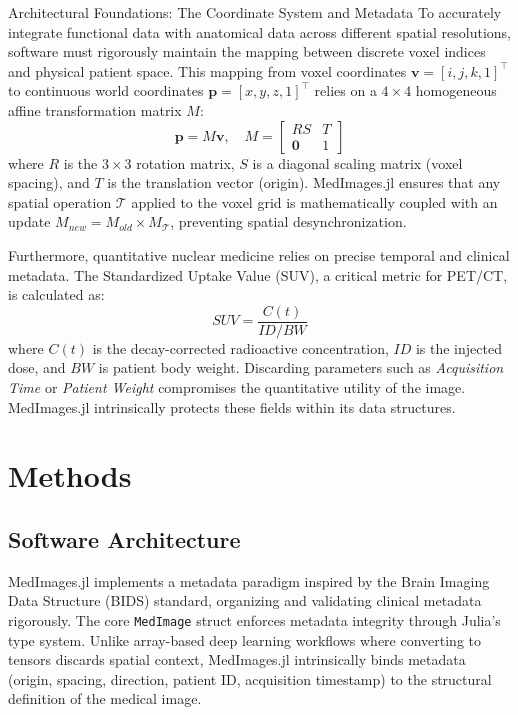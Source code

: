 \documentclass[10pt,letterpaper]{article}
\begin{document}
Architectural Foundations: The Coordinate System and Metadata
To accurately integrate functional data with anatomical data across different spatial resolutions, software must rigorously maintain the mapping between discrete voxel indices and physical patient space. This mapping from voxel coordinates $\mathbf{v} = [i, j, k, 1]^\top$ to continuous world coordinates $\mathbf{p} = [x, y, z, 1]^\top$ relies on a $4 \times 4$ homogeneous affine transformation matrix $M$:
\begin{equation}
\mathbf{p} = M \mathbf{v}, \quad M = 
\begin{bmatrix} 
R S & T \\
\mathbf{0} & 1
\end{bmatrix}
\end{equation}
where $R$ is the $3 \times 3$ rotation matrix, $S$ is a diagonal scaling matrix (voxel spacing), and $T$ is the translation vector (origin). MedImages.jl ensures that any spatial operation $\mathcal{T}$ applied to the voxel grid is mathematically coupled with an update $M_{new} = M_{old} \times M_{\mathcal{T}}$, preventing spatial desynchronization.

Furthermore, quantitative nuclear medicine relies on precise temporal and clinical metadata. The Standardized Uptake Value (SUV), a critical metric for PET/CT, is calculated as:
\begin{equation}
SUV = \frac{C(t)}{ID / BW}
\end{equation}
where $C(t)$ is the decay-corrected radioactive concentration, $ID$ is the injected dose, and $BW$ is patient body weight. Discarding parameters such as \textit{Acquisition Time} or \textit{Patient Weight} compromises the quantitative utility of the image. MedImages.jl intrinsically protects these fields within its data structures.

\section{Methods}

\subsection*{Software Architecture}
MedImages.jl implements a metadata paradigm inspired by the Brain Imaging Data Structure (BIDS) standard, organizing and validating clinical metadata rigorously. The core \texttt{MedImage} struct enforces metadata integrity through Julia's type system. Unlike array-based deep learning workflows where converting to tensors discards spatial context, MedImages.jl intrinsically binds metadata (origin, spacing, direction, patient ID, acquisition timestamp) to the structural definition of the medical image.
\end{document}
